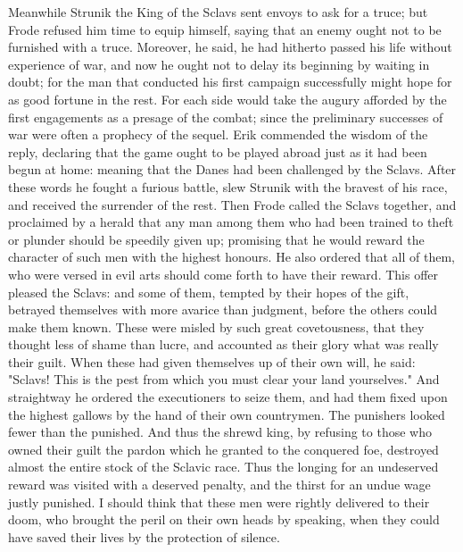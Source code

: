 \documentclass[10pt,a4paper]{report}
\begin{document}
Meanwhile Strunik the King of the Sclavs sent envoys to ask for a truce; but Frode refused him time to equip himself, saying that an enemy ought not to be furnished with a truce. Moreover, he said, he had hitherto passed his life without experience of war, and now he ought not to delay its beginning by waiting in doubt; for the man that conducted his first campaign successfully might hope for as good fortune in the rest. For each side would take the augury afforded by the first engagements as a presage of the combat; since the preliminary successes of war were often a prophecy of the sequel. Erik commended the wisdom of the reply, declaring that the game ought to be played abroad just as it had been begun at home: meaning that the Danes had been challenged by the Sclavs. After these words he fought a furious battle, slew Strunik with the bravest of his race, and received the surrender of the rest. Then Frode called the Sclavs together, and proclaimed by a herald that any man among them who had been trained to theft or plunder should be speedily given up; promising that he would reward the character of such men with the highest honours. He also ordered that all of them, who were versed in evil arts should come forth to have their reward. This offer pleased the Sclavs: and some of them, tempted by their hopes of the gift, betrayed themselves with more avarice than judgment, before the others could make them known. These were misled by such great covetousness, that they thought less of shame than lucre, and accounted as their glory what was really their guilt. When these had given themselves up of their own will, he said: "Sclavs! This is the pest from which you must clear your land yourselves." And straightway he ordered the executioners to seize them, and had them fixed upon the highest gallows by the hand of their own countrymen. The punishers looked fewer than the punished. And thus the shrewd king, by refusing to those who owned their guilt the pardon which he granted to the conquered foe, destroyed almost the entire stock of the Sclavic race. Thus the longing for an undeserved reward was visited with a deserved penalty, and the thirst for an undue wage justly punished. I should think that these men were rightly delivered to their doom, who brought the peril on their own heads by speaking, when they could have saved their lives by the protection of silence.\\
\end{document}
